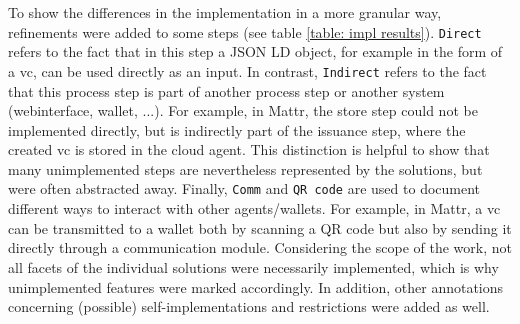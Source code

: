    To show the differences in the implementation in a more granular way, refinements were added to some steps (see table \ref{table: impl results}). \texttt{Direct} refers to the fact that in this step a JSON LD object, for example in the form of a \ac{vc}, can be used directly as an input. In contrast, \texttt{Indirect} refers to the fact that this process step is part of another process step or another system (webinterface, wallet, ...). For example, in Mattr, the store step could not be implemented directly, but is indirectly part of the issuance step, where the created \ac{vc} is stored in the cloud agent. This distinction is helpful to show that many unimplemented steps are nevertheless represented by the solutions, but were often abstracted away. Finally, \texttt{Comm} and \texttt{QR code} are used to document different ways to interact with other agents/wallets. For example, in Mattr, a \ac{vc} can be transmitted to a wallet both by scanning a QR code but also by sending it directly through a communication module. Considering the scope of the work, not all facets of the individual solutions were necessarily implemented, which is why unimplemented features were marked accordingly. In addition, other annotations concerning (possible) self-implementations and restrictions were added as well.
     
